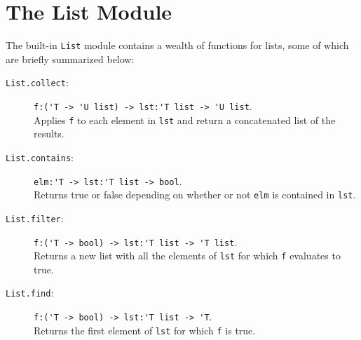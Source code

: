 \documentclass[springer.tex]{subfiles}
\begin{document}
\section{The List Module}
The built-in \lstinline{List} module contains a wealth of functions for lists, some of which are
briefly summarized below:
\begin{description}
\item[\texttt{List.collect}:] \lstinline{f:('T -> 'U list) -> lst:'T list -> 'U list}.~\\
  Applies \lstinline{f} to each element in \lstinline{lst} and return a concatenated list of the results.
\item[\texttt{List.contains}:] \lstinline{elm:'T -> lst:'T list -> bool}.~\\
  Returns true or false depending on whether or not \lstinline{elm} is contained in \lstinline{lst}.
\item[\texttt{List.filter}:] \lstinline{f:('T -> bool) -> lst:'T list -> 'T list}.~\\
  Returns a new list with all the elements of \lstinline{lst} for which \lstinline{f} evaluates to true.
\item[\texttt{List.find}:] \lstinline{f:('T -> bool) -> lst:'T list -> 'T}.~\\
  Returns the first element of \lstinline{lst} for which \lstinline{f} is true.

\end{description}
\end{document}
